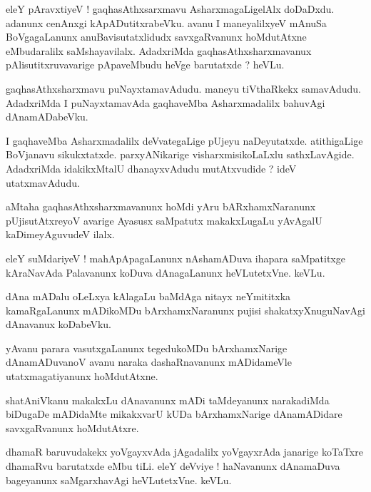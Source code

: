 \documentclass{article}
\begin{document}
\begin{mn}%
eleY pAravxtiyeV ! gaqhasAthxsarxmavu AsharxmagaLigelAlx doDaDxdu. adanunx cenAnxgi 
kApADutitxrabeVku. avanu I maneyalilxyeV mAnuSa BoVgagaLanunx anuBavisutatxlidudx savxgaRvanunx 
hoMdutAtxne eMbudaralilx saMshayavilalx. AdadxriMda gaqhasAthxsharxmavanux pAlisutitxruvavarige 
pApaveMbudu heVge barutatxde ? heVLu.
\end{mn}

\begin{mn}%
gaqhasAthxsharxmavu puNayxtamavAdudu. maneyu tiVthaRkekx samavAdudu. AdadxriMda I puNayxtamavAda 
gaqhaveMba Asharxmadalilx bahuvAgi dAnamADabeVku.
\end{mn}

\begin{mn}%
I gaqhaveMba Asharxmadalilx deVvategaLige pUjeyu naDeyutatxde. atithigaLige BoVjanavu sikukxtatxde. 
parxyANikarige visharxmisikoLaLxlu sathxLavAgide. AdadxriMda idakikxMtalU dhanayxvAdudu 
mutAtxvudide ? ideV utatxmavAdudu.
\end{mn}

\begin{mn}%
aMtaha gaqhasAthxsharxmavanunx hoMdi yAru bARxhamxNaranunx pUjisutAtxreyoV avarige Ayasusx 
saMpatutx makakxLugaLu yAvAgalU kaDimeyAguvudeV ilalx.
\end{mn}

\begin{mn}%
eleY suMdariyeV ! mahApApagaLanunx nAshamADuva ihapara saMpatitxge kAraNavAda Palavanunx koDuva 
dAnagaLanunx heVLutetxVne. keVLu.
\end{mn}

\begin{mn}%
dAna mADalu oLeLxya kAlagaLu baMdAga nitayx neYmititxka kamaRgaLanunx mADikoMDu bArxhamxNaranunx 
pujisi shakatxyXnuguNavAgi dAnavanux koDabeVku.
\end{mn}

\begin{mn}%
yAvanu parara vasutxgaLanunx tegedukoMDu bArxhamxNarige dAnamADuvanoV avanu naraka dashaRnavanunx 
mADidameVle utatxmagatiyanunx hoMdutAtxne.
\end{mn}

\begin{mn}%
shatAniVkanu makakxLu dAnavanunx mADi taMdeyanunx narakadiMda biDugaDe mADidaMte mikakxvarU kUDa 
bArxhamxNarige dAnamADidare savxgaRvanunx hoMdutAtxre.
\end{mn}

\begin{mn}%
dhamaR baruvudakekx yoVgayxvAda jAgadalilx yoVgayxrAda janarige koTaTxre dhamaRvu barutatxde eMbu 
tiLi. eleY deVviye ! haNavanunx dAnamaDuva bageyanunx saMgarxhavAgi heVLutetxVne. keVLu.
\end{mn}
\end{document}

